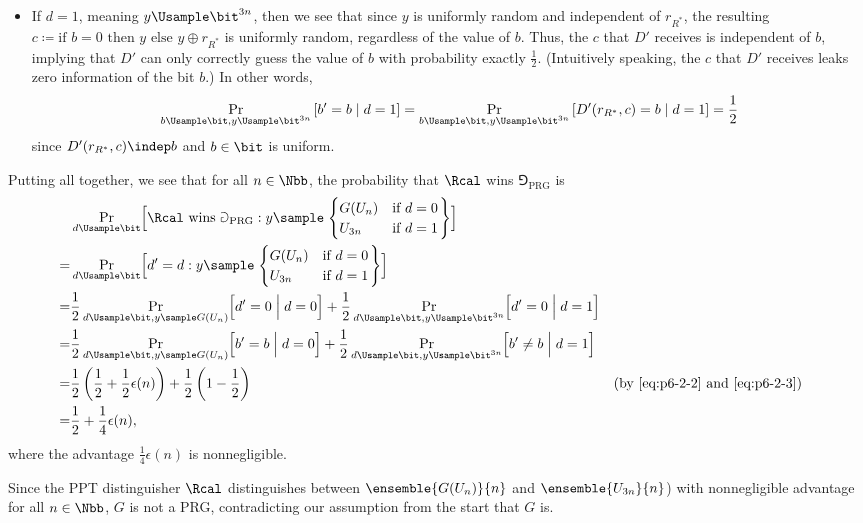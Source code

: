 \begin{answer}[b]
\begin{itemize}
        \item If $d=1$, meaning $y\Usample \bit^{3n}$, then we see that since $y$ is uniformly random and independent of $r_{R^\ast}$, the resulting $c\coloneqq \textrm{if } b=0 \textrm{ then } y \textrm{ else } y\oplus r_{R^\ast}$ is uniformly random, regardless of the value of $b$. Thus, the $c$ that $D'$ receives is independent of $b$, implying that $D'$ can only correctly guess the value of $b$ with probability exactly $\frac{1}{2}$. (Intuitively speaking, the $c$ that $D'$ receives leaks zero information of the bit $b$.) In other words,
        \begin{equation}\label{eq:p6-2-3}
            \Pr_{b\Usample\bit,y\Usample \bit^{3n}}\left[ b'=b \mid d=1\right]
            = \Pr_{b\Usample\bit,y\Usample \bit^{3n}}\left[ D'(r_{R^\ast}, c)=b \mid d=1\right]
            =\frac{1}{2}
        \end{equation}
        since $D'(r_{R^\ast}, c) \indep b$ and $b\in\bit$ is uniform.
    \end{itemize}
    Putting all together, we see that for all $n\in\Nbb$, the probability that $\Rcal$ wins $\Game_{\textrm{PRG}}$ is
    \begin{align*}
        &\Pr_{d\Usample\bit}\Bigl[ \Rcal \textrm{ wins } \Game_{\textrm{PRG}} : y \sample \left.\begin{cases}
                G(U_n) &\textrm{if } d=0\\
                U_{3n} &\textrm{if } d=1
            \end{cases}\right\} \Bigr]\\
        =&\Pr_{d\Usample\bit}\Bigl[ d'=d : y \sample \left.\begin{cases}
                G(U_n) &\textrm{if } d=0\\
                U_{3n} &\textrm{if } d=1
            \end{cases}\right\} \Bigr]\\
        =& \frac{1}{2}\Pr_{d\Usample\bit,y\sample G(U_n)}\Bigl[ d'=0 \Bigm\vert d=0 \Bigr] + \frac{1}{2}\Pr_{d\Usample\bit,y\Usample \bit^{3n}}\Bigl[ d'=0 \Bigm\vert d=1 \Bigr]\\
        =& \frac{1}{2}\Pr_{d\Usample\bit,y\sample G(U_n)}\Bigl[ b'=b \Bigm\vert d=0 \Bigr] + \frac{1}{2}\Pr_{d\Usample\bit,y\Usample \bit^{3n}}\Bigl[ b'\neq b \Bigm\vert d=1 \Bigr]\\
        =& \frac{1}{2}\left(\frac{1}{2}+\frac{1}{2}\epsilon(n)\right)+ \frac{1}{2}\left(1-\frac{1}{2}\right) && \textrm{(by \eqref{eq:p6-2-2} and \eqref{eq:p6-2-3})}\\
        =& \frac{1}{2}+\frac{1}{4}\epsilon(n),
    \end{align*}
    where the advantage $\frac{1}{4}\epsilon(n)$ is nonnegligible.

    Since the PPT distinguisher $\Rcal$ distinguishes between $\ensemble{G(U_n)}{n}$ and $\ensemble{U_{3n}}{n}$) with nonnegligible advantage for all $n\in\Nbb$, $G$ is not a PRG, contradicting our assumption from the start that $G$ is.
\end{answer}








